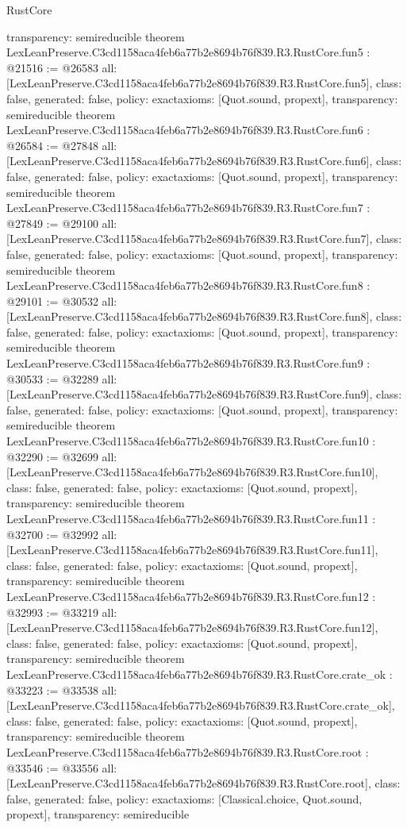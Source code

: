\begin{lexlean}{RustCore}
\begin{coremodule}
{  transparency: semireducible
}
theorem LexLeanPreserve.C3cd1158aca4feb6a77b2e8694b76f839.R3.RustCore.fun5 : @21516 := @26583 {
  all: [LexLeanPreserve.C3cd1158aca4feb6a77b2e8694b76f839.R3.RustCore.fun5],
  class: false,
  generated: false,
  policy: exact{axioms: [Quot.sound, propext]},
  transparency: semireducible
}
theorem LexLeanPreserve.C3cd1158aca4feb6a77b2e8694b76f839.R3.RustCore.fun6 : @26584 := @27848 {
  all: [LexLeanPreserve.C3cd1158aca4feb6a77b2e8694b76f839.R3.RustCore.fun6],
  class: false,
  generated: false,
  policy: exact{axioms: [Quot.sound, propext]},
  transparency: semireducible
}
theorem LexLeanPreserve.C3cd1158aca4feb6a77b2e8694b76f839.R3.RustCore.fun7 : @27849 := @29100 {
  all: [LexLeanPreserve.C3cd1158aca4feb6a77b2e8694b76f839.R3.RustCore.fun7],
  class: false,
  generated: false,
  policy: exact{axioms: [Quot.sound, propext]},
  transparency: semireducible
}
theorem LexLeanPreserve.C3cd1158aca4feb6a77b2e8694b76f839.R3.RustCore.fun8 : @29101 := @30532 {
  all: [LexLeanPreserve.C3cd1158aca4feb6a77b2e8694b76f839.R3.RustCore.fun8],
  class: false,
  generated: false,
  policy: exact{axioms: [Quot.sound, propext]},
  transparency: semireducible
}
theorem LexLeanPreserve.C3cd1158aca4feb6a77b2e8694b76f839.R3.RustCore.fun9 : @30533 := @32289 {
  all: [LexLeanPreserve.C3cd1158aca4feb6a77b2e8694b76f839.R3.RustCore.fun9],
  class: false,
  generated: false,
  policy: exact{axioms: [Quot.sound, propext]},
  transparency: semireducible
}
theorem LexLeanPreserve.C3cd1158aca4feb6a77b2e8694b76f839.R3.RustCore.fun10 : @32290 := @32699 {
  all: [LexLeanPreserve.C3cd1158aca4feb6a77b2e8694b76f839.R3.RustCore.fun10],
  class: false,
  generated: false,
  policy: exact{axioms: [Quot.sound, propext]},
  transparency: semireducible
}
theorem LexLeanPreserve.C3cd1158aca4feb6a77b2e8694b76f839.R3.RustCore.fun11 : @32700 := @32992 {
  all: [LexLeanPreserve.C3cd1158aca4feb6a77b2e8694b76f839.R3.RustCore.fun11],
  class: false,
  generated: false,
  policy: exact{axioms: [Quot.sound, propext]},
  transparency: semireducible
}
theorem LexLeanPreserve.C3cd1158aca4feb6a77b2e8694b76f839.R3.RustCore.fun12 : @32993 := @33219 {
  all: [LexLeanPreserve.C3cd1158aca4feb6a77b2e8694b76f839.R3.RustCore.fun12],
  class: false,
  generated: false,
  policy: exact{axioms: [Quot.sound, propext]},
  transparency: semireducible
}
theorem LexLeanPreserve.C3cd1158aca4feb6a77b2e8694b76f839.R3.RustCore.crate_ok : @33223 := @33538 {
  all: [LexLeanPreserve.C3cd1158aca4feb6a77b2e8694b76f839.R3.RustCore.crate_ok],
  class: false,
  generated: false,
  policy: exact{axioms: [Quot.sound, propext]},
  transparency: semireducible
}
theorem LexLeanPreserve.C3cd1158aca4feb6a77b2e8694b76f839.R3.RustCore.root : @33546 := @33556 {
  all: [LexLeanPreserve.C3cd1158aca4feb6a77b2e8694b76f839.R3.RustCore.root],
  class: false,
  generated: false,
  policy: exact{axioms: [Classical.choice, Quot.sound, propext]},
  transparency: semireducible
}


\end{coremodule}
\end{lexlean}

